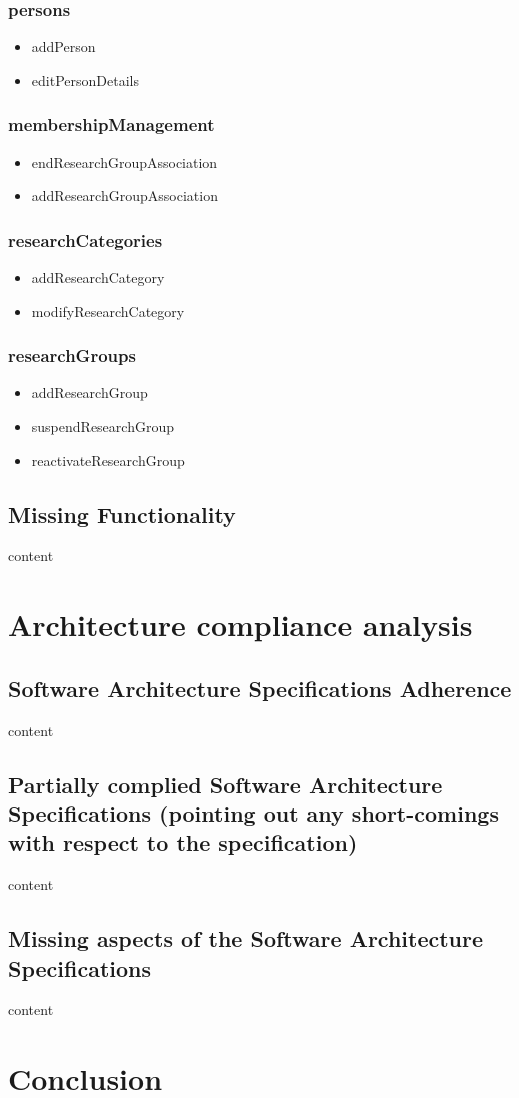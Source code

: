 \documentclass{article}
\begin{document}
    	\subsubsection{persons}
			\begin{itemize}
			\item addPerson
			\item editPersonDetails
			\end{itemize}
		\subsubsection{membershipManagement}
			\begin{itemize}
			\item endResearchGroupAssociation
			\item addResearchGroupAssociation
			\end{itemize}
		\subsubsection{researchCategories}
			\begin{itemize}
			\item addResearchCategory
			\item modifyResearchCategory
			\end{itemize}
		\subsubsection{researchGroups}
			\begin{itemize}
			\item addResearchGroup
			\item suspendResearchGroup
			\item reactivateResearchGroup
			\end{itemize}

    \subsection{Missing Functionality}
    content

   \newpage

\section{Architecture compliance analysis}
     \subsection{Software Architecture Specifications Adherence}
     content

     \subsection{Partially complied Software Architecture Specifications (pointing out any short-comings with respect to the specification)}
     content

     \subsection{Missing aspects of the Software Architecture Specifications}
     content

   	\newpage

\section{Conclusion}
\end{document}
